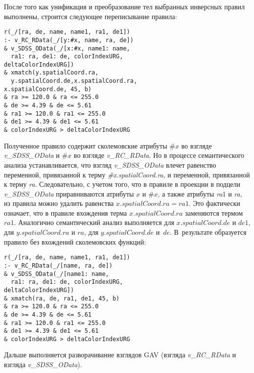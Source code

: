 \begin{multicols}{2}
После того как унификация и преобразование тел выбранных инверсных правил
выполнены, строится следующее переписывание правила:
\begin{verbatim}
r(_/[ra, de, name, name1, ra1, de1])
:- v_RC_RData(_/[y:#x, name, ra, de])
& v_SDSS_OData(_/[x:#x, name1: name,
  ra1: ra, de1: de, colorIndexURG,
deltaColorIndexURG])
& xmatch(y.spatialCoord.ra,
  y.spatialCoord.de,x.spatialCoord.ra,
x.spatialCoord.de, 45, b)
& ra >= 120.0 & ra <= 255.0
& de >= 4.39 & de <= 5.61
& ra1 >= 120.0 & ra1 <= 255.0
& de1 >= 4.39 & de1 <= 5.61
& colorIndexURG > deltaColorIndexURG
\end{verbatim}

     Полученное правило содержит сколемовские атрибуты $\#x$ во взгляде
\textit{v\_SDSS\_OData} и $\#x$ во взгляде \textit{v\_RC\_RData}. Но в процессе
семантического анализа устанавливается, что взгляд \textit{v\_SDSS\_OData} влечет
равенство переменной, привязанной  к терму \textit{\#x.spatialCoord.ra}, и
переменной, привязанной к терму \textit{ra}. Следовательно, с учетом того, что в правиле
в проекции в подцели \textit{v\_SDSS\_OData} приравниваются атрибуты $x$ и $\#x$, а
также атрибуты \textit{ra}1 и \textit{ra}, из правила можно удалить равенства
$x.spatialCoord.ra=ra1$. Это фактически означает, что в правиле вхождения терма
$x.spatialCoord.ra$ заменяются термом $ra1$. Аналогично семантический
анализ выполняется для $x.spatialCoord.de$ и $de1$, для
$y.spatialCoord.ra$ и $ra$, для $y.spatialCoord.de$ и~$de$. В~результате
образуется правило без вхождений сколемовских функций:
     \begin{verbatim}
r(_/[ra, de, name, name1, ra1, de1])
:- v_RC_RData(_/[name, ra, de])
& v_SDSS_OData(_/[name1: name,
  ra1: ra, de1: de, colorIndexURG,
deltaColorIndexURG])
& xmatch(ra, de, ra1, de1, 45, b)
& ra >= 120.0 & ra <= 255.0
& de >= 4.39 & de <= 5.61
& ra1 >= 120.0 & ra1 <= 255.0
& de1 >= 4.39 & de1 <= 5.61
& colorIndexURG > deltaColorIndexURG
     \end{verbatim}

 Дальше выполняется разворачивание взглядов GAV (взгляда \textit{v\_RC\_RData} и
взгляда \textit{v\_SDSS\_OData}).


\end{multicols}
